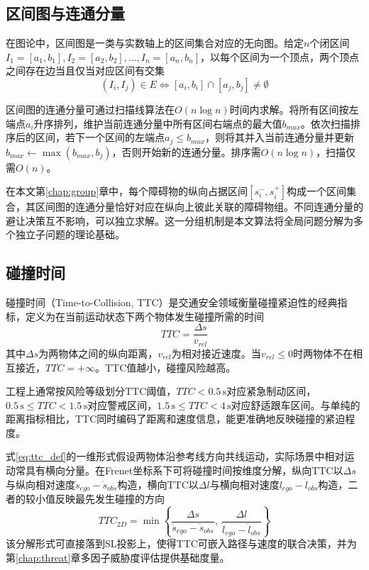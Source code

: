 \subsection{区间图与连通分量}

在图论中，区间图是一类与实数轴上的区间集合对应的无向图。给定$n$个闭区间$I_1 = [a_1, b_1], I_2 = [a_2, b_2], \ldots, I_n = [a_n, b_n]$，以每个区间为一个顶点，两个顶点之间存在边当且仅当对应区间有交集
\begin{equation}
(I_i, I_j) \in E \iff [a_i, b_i] \cap [a_j, b_j] \neq \emptyset
\label{eq:interval_graph}
\end{equation}

区间图的连通分量可通过扫描线算法在$O(n \log n)$时间内求解。将所有区间按左端点$a_i$升序排列，维护当前连通分量中所有区间右端点的最大值$b_{max}$。依次扫描排序后的区间，若下一个区间的左端点$a_j \leq b_{max}$，则将其并入当前连通分量并更新$b_{max} \leftarrow \max(b_{max}, b_j)$，否则开始新的连通分量。排序需$O(n \log n)$，扫描仅需$O(n)$。

在本文第\ref{chap:group}章中，每个障碍物的纵向占据区间$[s_i^{-}, s_i^{+}]$构成一个区间集合，其区间图的连通分量恰好对应在纵向上彼此关联的障碍物组。不同连通分量的避让决策互不影响，可以独立求解。这一分组机制是本文算法将全局问题分解为多个独立子问题的理论基础。

\subsection{碰撞时间}

碰撞时间（Time-to-Collision, TTC）是交通安全领域衡量碰撞紧迫性的经典指标\cite{paden2016}，定义为在当前运动状态下两个物体发生碰撞所需的时间
\begin{equation}
TTC = \frac{\Delta s}{v_{rel}}
\label{eq:ttc_def}
\end{equation}
其中$\Delta s$为两物体之间的纵向距离，$v_{rel}$为相对接近速度。当$v_{rel} \leq 0$时两物体不在相互接近，$TTC = +\infty$。TTC值越小，碰撞风险越高。

工程上通常按风险等级划分TTC阈值，$TTC < 0.5\,\mathrm{s}$对应紧急制动区间，$0.5\,\mathrm{s} \leq TTC < 1.5\,\mathrm{s}$对应警戒区间，$1.5\,\mathrm{s} \leq TTC < 4\,\mathrm{s}$对应舒适跟车区间。与单纯的距离指标相比，TTC同时编码了距离和速度信息，能更准确地反映碰撞的紧迫程度。

式\eqref{eq:ttc_def}的一维形式假设两物体沿参考线方向共线运动，实际场景中相对运动常具有横向分量。在Frenet坐标系下可将碰撞时间按维度分解，纵向TTC以$\Delta s$与纵向相对速度$\dot{s}_{ego} - \dot{s}_{obs}$构造，横向TTC以$\Delta l$与横向相对速度$\dot{l}_{ego} - \dot{l}_{obs}$构造，二者的较小值反映最先发生碰撞的方向
\begin{equation}
TTC_{2D} = \min\left\{\frac{\Delta s}{\dot{s}_{ego} - \dot{s}_{obs}},\ \frac{\Delta l}{\dot{l}_{ego} - \dot{l}_{obs}}\right\}
\label{eq:ttc_2d}
\end{equation}
该分解形式可直接落到SL投影上，使得TTC可嵌入路径与速度的联合决策，并为第\ref{chap:threat}章多因子威胁度评估提供基础度量。

